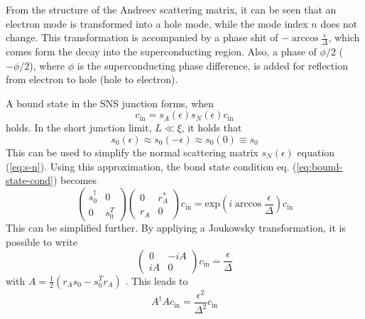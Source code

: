 From the structure of the Andreev scattering matrix, it can be seen that an electron mode is transformed into a hole mode, while the mode index $n$ does not change. This transformation is accompanied by a phase shit of $- \arccos \frac{\epsilon}{\Delta} $, which comes form the decay into the superconducting region. Also, a phase of $\phi/2$ ($-\phi/2$), where $\phi$ is the superconducting phase difference, is added for reflection from electron to hole (hole to electron).


A bound state in the SNS junction forms, when 
\begin{equation}
c_\text{in} = s_A ( \epsilon ) s_N ( \epsilon ) c_\text{in} \label{eq:bound-state-cond}
\end{equation}
holds. In the short junction limit, $L \ll \xi$, it holds that
\begin{equation}
s_0 ( \epsilon ) \approx s_0 ( - \epsilon ) \approx s_0 ( 0) \equiv s_0
\end{equation}
This can be used to simplify the normal scattering matrix $s_N (\epsilon) $ equation (\ref{eq:s-n}). Using this approximation, the bond state condition eq. (\ref{eq:bound-state-cond}) becomes
\begin{equation}
\begin{pmatrix} s_0^\dagger & 0\\ 0 & s_0^T \end{pmatrix}  \begin{pmatrix} 0 & r_A^* \\ r_A & 0 \end{pmatrix}  c_\text{in} = \text{exp} \left( i \arccos \frac{\epsilon}{\Delta} \right) c_\text{in}
\end{equation}
This can be simplified further. By appliying a Joukowsky transformation, it is possible to write
\begin{equation}
\begin{pmatrix} 0 & - i A \\ i A & 0 \end{pmatrix} c_\text{in} = \frac{\epsilon}{\Delta}
\end{equation}
with $A = \frac{1}{2} ( r_A s_0 - s_0^T r_A)$ . This leads  to
\begin{equation}
A^\dagger A c_\text{in} = \frac{\epsilon^2}{\Delta^2} c_\text{in} \label{eq:bound-state-final}
\end{equation}


